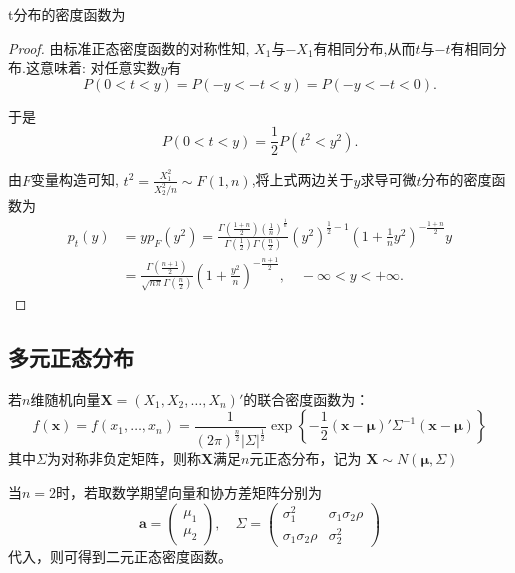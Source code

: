 \begin{proposition}
    t分布的密度函数为
\end{proposition}

\begin{proof}
    由标准正态密度函数的对称性知, $X_1$与$-X_1$有相同分布,从而$t$与$-t$有相同分布.这意味着: 对任意实数$y$有
    \[P(0<t<y)=P(-y<-t<y)=P(-y<-t<0).\]

    于是
    \[P(0<t<y)=\frac12P(t^2<y^2).\]

    由$F$变量构造可知, $t^2=\frac{X_1^2}{X_2^2/n}\sim F(1,n)$,将上式两边关于$y$求导可微$t$分布的密度函数为
    \begin{align*}
        p_t(y) & =yp_F(y^2)=\frac{\Gamma \left( \frac{1+n}{2} \right) \left( \frac{1}{n} \right) ^{\frac{1}{n}}}{\Gamma \left( \frac{1}{2} \right) \Gamma \left( \frac{n}{2} \right)}\left( y^2 \right) ^{\frac{1}{2}-1}\left( 1+\frac{1}{n}y^2 \right) ^{-\frac{1+n}{2}}y \\
               & =\frac{\Gamma \left( \frac{n+1}{2} \right)}{\sqrt{n\pi}\Gamma \left( \frac{n}{2} \right)}\left( 1+\frac{y^2}{n} \right) ^{-\frac{n+1}{2}},\quad -\infty<y<+\infty.
    \end{align*}
\end{proof}

\subsection{多元正态分布}

\begin{definition}[多元正态分布]
    若$n$维随机向量$\mathbf{X}=(X_1,X_2,\ldots,X_n)'$的联合密度函数为：
    \[ f(\mathbf{x})=f(x_1,\ldots,x_n)=\frac1{(2\pi)^{\frac{n}{2}} |\Sigma|^{\frac1{2}} }\exp\left\{ -\frac1{2}(\mathbf{x}-\mathbf{\mu})'\Sigma^{-1}(\mathbf{x}-\mathbf{\mu}) \right\} \]
    其中$\Sigma$为对称非负定矩阵，则称$\mathbf{X}$满足$n$元正态分布，记为 $\mathbf{X}\sim N(\mathbf{\mu},\Sigma)$
\end{definition}

当$n=2$时，若取数学期望向量和协方差矩阵分别为
	\begin{equation*}
		\mathbf{a}=\begin{pmatrix}
			\mu_1 \\
			\mu_2
		\end{pmatrix},\quad \Sigma=\begin{pmatrix}
			\sigma_1^2           & \sigma_1\sigma_2\rho \\
			\sigma_1\sigma_2\rho & \sigma_2^2
		\end{pmatrix}
	\end{equation*}
代入，则可得到二元正态密度函数。

